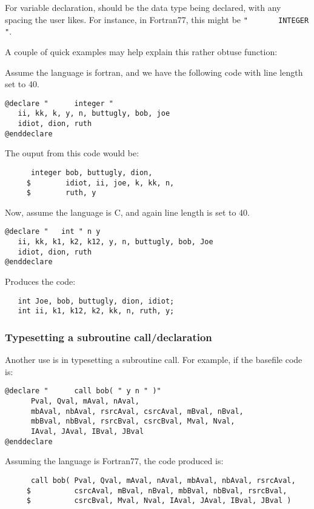 For variable declaration, {\tt <start string>} should be the data type
being declared, with any spacing the user likes.  For instance, in Fortran77,
this might be 
\verb+"       INTEGER "+.  

A couple of quick examples may help explain this rather obtuse function:

Assume the language is fortran, and we have the following code with
line length set to 40.
\begin{verbatim}
@declare "      integer "
   ii, kk, k, y, n, buttugly, bob, joe
   idiot, dion, ruth
@enddeclare
\end{verbatim}
The ouput from this code would be:
\begin{verbatim}
      integer bob, buttugly, dion,
     $        idiot, ii, joe, k, kk, n,
     $        ruth, y
\end{verbatim}

\noindent
Now, assume the language is C, and again line length is set to 40.
\begin{verbatim}
@declare "   int " n y
   ii, kk, k1, k2, k12, y, n, buttugly, bob, Joe
   idiot, dion, ruth
@enddeclare
\end{verbatim}

\noindent
Produces the code:
\begin{verbatim}
   int Joe, bob, buttugly, dion, idiot;
   int ii, k1, k12, k2, kk, n, ruth, y;
\end{verbatim}

\subsubsection{Typesetting a subroutine call/declaration}
Another use is in typesetting a subroutine call.  For example, if the basefile
code is:
\begin{verbatim}
@declare "      call bob( " y n " )"
      Pval, Qval, mAval, nAval,
      mbAval, nbAval, rsrcAval, csrcAval, mBval, nBval,         
      mbBval, nbBval, rsrcBval, csrcBval, Mval, Nval,           
      IAval, JAval, IBval, JBval
@enddeclare
\end{verbatim}

\noindent
Assuming the language is Fortran77, the code produced is:
\begin{verbatim}
      call bob( Pval, Qval, mAval, nAval, mbAval, nbAval, rsrcAval, 
     $          csrcAval, mBval, nBval, mbBval, nbBval, rsrcBval, 
     $          csrcBval, Mval, Nval, IAval, JAval, IBval, JBval )
\end{verbatim}

